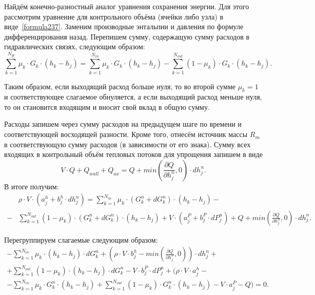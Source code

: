 
Найдём конечно-разностный аналог уравнения сохранения энергии. Для этого рассмотрим уравнение для контрольного объёма (ячейки либо узла) в виде~\eqref{formula237}. Заменим производные энтальпии и давления по формуле дифференцирования назад. Перепишем сумму, содержащую сумму расходов в гидравлических связях, следующим образом:
\begin{equation}
\label{formula414}
\sum_{k=1}^{N_{gc}} \mu_k \cdot G_k \cdot (h_k-h_j) = \sum_{k=1}^{N_{in}} \mu_k \cdot G_k \cdot (h_k-h_j) - \sum_{k=1}^{N_{out}} (1-\mu_k) \cdot G_k \cdot (h_k-h_j).
\end{equation}

Таким образом, если выходящий расход больше нуля, то во второй сумме $\mu_k=1$ и соответствующее слагаемое обнуляется, а если выходящий расход меньше нуля, то он становится входящим и вносит свой вклад в общую сумму.

Расходы запишем через сумму расходов на предыдущем шаге по времени и соответствующей восходящей разности. Кроме того, отнесём источник массы $R_m$ в соответствующую сумму расходов (в зависимости от его знака). Сумму всех входящих в контрольный объём тепловых потоков для упрощения запишем в виде $$V\cdot Q + Q_{wall} + Q_{ax} = Q+min\left(\frac{\partial Q}{\partial h_j^n},0 \right)\cdot dh_j^n.$$ В итоге получим: 
\begin{align}
\label{formula415}
&\rho\cdot V\cdot (a_j^h + b_j^h \cdot dh_j^n)=\sum_{k=1}^{N_{in}} \mu_k \cdot (G_k^n+dG_k^n) \cdot (h_k-h_j) - \nonumber ~\\
- &\sum_{k=1}^{N_{out}} (1-\mu_k) \cdot (G_k^n+dG_k^n) \cdot (h_k-h_j) + V\cdot (a_j^P+b_j^P\cdot dP_j^n)
+Q+min\left(\frac{\partial Q}{\partial h_j^n},0 \right)\cdot dh_j^n.
\end{align}

Перегруппируем слагаемые следующим образом:
\begin{eqnarray}
\label{formula416}
-\sum_{k=1}^{N_{in}} \mu_k \cdot (h_k-h_j) \cdot dG_k^n + \left(\rho\cdot V\cdot b_j^h - min\left(\frac{\partial Q}{\partial h_j^n},0 \right) \right) \cdot dh_j^n + \nonumber ~\\
+ \sum_{k=1}^{N_{out}} (1-\mu_k) \cdot (h_k-h_j) \cdot dG_k^n - V \cdot b_j^P \cdot dP_j^n + \bigg(\rho\cdot V\cdot a_j^h - \nonumber ~\\
- \sum_{k=1}^{N_{in}} \mu_k \cdot G_k^n \cdot (h_k-h_j) + \sum_{k=1}^{N_{out}} (1-\mu_k) \cdot G_k^n \cdot (h_k-h_j) - V \cdot a_j^P -Q \bigg)=0.  
\end{eqnarray}


